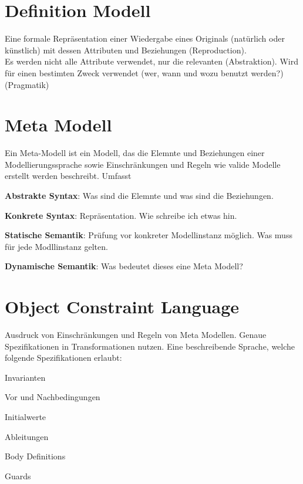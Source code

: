 \section{Definition Modell}
Eine formale Repräsentation einer
Wiedergabe eines Originals (natürlich oder künstlich) mit dessen Attributen und
Beziehungen (Reproduction). \\
Es werden nicht alle Attribute verwendet, nur die relevanten (Abstraktion).
Wird für einen bestimten Zweck verwendet (wer, wann und wozu benutzt werden?)
(Pragmatik)

\section{Meta Modell}
Ein Meta-Modell ist ein Modell, das die Elemnte  und Beziehungen einer
Modellierungssprache sowie Einschränkungen und Regeln wie valide Modelle erstellt
werden beschreibt. Umfasst
\begin{compactitem}
    \item \textbf{Abstrakte Syntax}: Was sind die Elemnte und was sind die Beziehungen.
    \item \textbf{Konkrete Syntax}: Repräsentation. Wie schreibe ich etwas hin.
    \item \textbf{Statische Semantik}: Prüfung vor konkreter Modellinstanz möglich.
    Was muss für jede Modllinstanz gelten.
    \item \textbf{Dynamische Semantik}: Was bedeutet dieses eine Meta Modell?
\end{compactitem}

\section{Object Constraint Language}
Ausdruck von Einschränkungen und Regeln von Meta Modellen.
Genaue Spezifikationen in Transformationen nutzen.
Eine beschreibende Sprache, welche folgende Spezifikationen erlaubt:
\begin{compactitem}
    \item Invarianten
    \item Vor und Nachbedingungen
    \item Initialwerte
    \item Ableitungen
    \item Body Definitions
    \item Guards
\end{compactitem}
